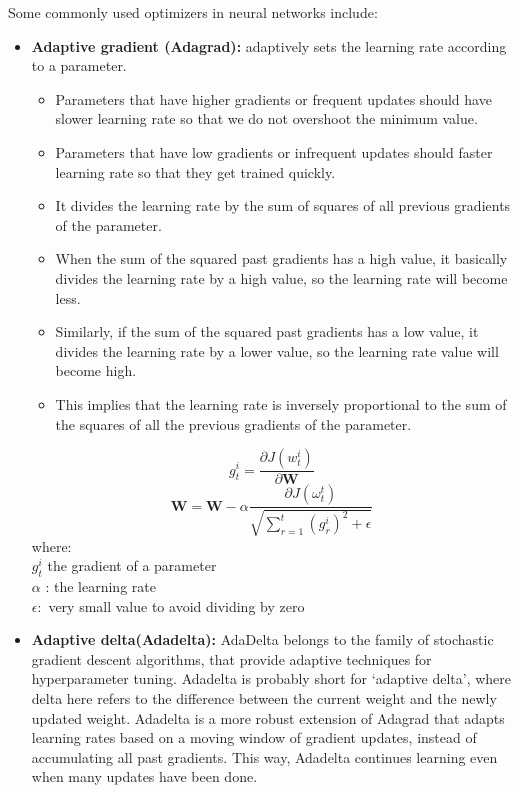 \begin{itemize}
Some commonly used optimizers in neural networks include:
\begin{itemize}
    \item \textbf{Adaptive gradient (Adagrad): } adaptively sets the learning rate according to a parameter.
\begin{itemize}
    \item Parameters that have higher gradients or frequent updates should have slower learning rate so that we do not overshoot the minimum value.
    \item Parameters that have low gradients or infrequent updates should faster learning rate so that they get trained quickly.
    \item  It divides the learning rate by the sum of squares of all previous gradients of the parameter.
    \item When the sum of the squared past gradients has a high value, it basically divides the learning rate by a high value, so the learning rate will become less.
    \item Similarly, if the sum of the squared past gradients has a low value, it divides the learning rate by a lower value, so the learning rate value will become high.
    \item This implies that the learning rate is inversely proportional to the sum of the squares of all the previous gradients of the parameter.
    \end{itemize}
    \[
    g_{t}^{i}=\frac{\partial J(w_{t}^{i})}{\partial \mathbf{W}}
    \]
    \[
    \mathbf{W}=\mathbf{W}-\alpha\frac{\partial J(\omega_{t}^{t})}{\sqrt{\sum_{r=1}^{t}(g_{r}^{i})^2+\epsilon}}
    \]
    where: \\
     $g_{t}^{i}$  the gradient of a parameter\\
    $\alpha$ : the learning rate\\
    $\epsilon: $ very small value to avoid dividing by zero
    
    \item \textbf{Adaptive delta(Adadelta): }AdaDelta belongs to the family of stochastic gradient descent algorithms, that provide adaptive techniques for hyperparameter tuning. Adadelta is probably short for ‘adaptive delta’, where delta here refers to the difference between the current weight and the newly updated weight.
    Adadelta is a more robust extension of Adagrad that adapts learning rates based on a moving window of gradient updates, instead of accumulating all past gradients. This way, Adadelta continues learning even when many updates have been done.
    

\end{itemize}
\end{itemize}
